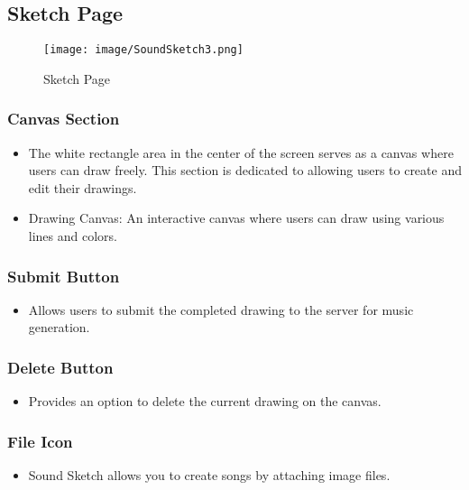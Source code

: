 \documentclass[conference]{IEEEtran}
\begin{document}
\clearpage

\subsection{Sketch Page }

\begin{figure}[h!]
    \centering
    \texttt{[image: image/SoundSketch3.png]}
    \caption{Sketch Page}
    \label{fig:enter-label}
\end{figure}

\subsubsection{Canvas Section}
\begin{itemize}
    \item The white rectangle area in the center of the screen serves as a canvas where users can draw freely. This section is dedicated to allowing users to create and edit their drawings.\\
    \item Drawing Canvas: An interactive canvas where users can draw using various lines and colors.\\
\end{itemize}

\subsubsection{Submit Button}
\begin{itemize}
    \item Allows users to submit the completed drawing to the server for music generation.\\
\end{itemize}

\subsubsection{Delete Button}
\begin{itemize}
    \item Provides an option to delete the current drawing on the canvas.\\
\end{itemize}

\subsubsection{File Icon}
\begin{itemize}
    \item Sound Sketch allows you to create songs by attaching image files.\\
\end{itemize}
\end{document}

